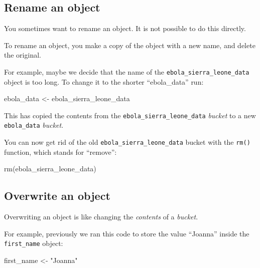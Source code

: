 \documentclass[
  letterpaper,
  DIV=11,
  numbers=noendperiod]{scrreprt}
\newenvironment{Shaded}{\begin{snugshade}}{\end{snugshade}}
\newcommand{\FunctionTok}[1]{\textcolor[rgb]{0.28,0.35,0.67}{#1}}
\newcommand{\NormalTok}[1]{\textcolor[rgb]{0.00,0.23,0.31}{#1}}
\newcommand{\OtherTok}[1]{\textcolor[rgb]{0.00,0.23,0.31}{#1}}
\newcommand{\StringTok}[1]{\textcolor[rgb]{0.13,0.47,0.30}{#1}}
\begin{document}
\subsection{Rename an object}\label{rename-an-object}

You sometimes want to rename an object. It is not possible to do this
directly.

To rename an object, you make a copy of the object with a new name, and
delete the original.

For example, maybe we decide that the name of the
\texttt{ebola\_sierra\_leone\_data} object is too long. To change it to
the shorter ``ebola\_data'' run:

\begin{Shaded}
\begin{Highlighting}[]
\NormalTok{ebola\_data }\OtherTok{\textless{}{-}}\NormalTok{ ebola\_sierra\_leone\_data}
\end{Highlighting}
\end{Shaded}

This has copied the contents from the
\texttt{ebola\_sierra\_leone\_data} \emph{bucket} to a new
\texttt{ebola\_data} \emph{bucket}.

You can now get rid of the old \texttt{ebola\_sierra\_leone\_data}
bucket with the \texttt{rm()} function, which stands for ``remove'':

\begin{Shaded}
\begin{Highlighting}[]
\FunctionTok{rm}\NormalTok{(ebola\_sierra\_leone\_data)}
\end{Highlighting}
\end{Shaded}

\subsection{Overwrite an object}\label{overwrite-an-object}

Overwriting an object is like changing the \emph{contents} of a
\emph{bucket}.

For example, previously we ran this code to store the value ``Joanna''
inside the \texttt{first\_name} object:

\begin{Shaded}
\begin{Highlighting}[]
\NormalTok{first\_name }\OtherTok{\textless{}{-}} \StringTok{"Joanna"}
\end{Highlighting}
\end{Shaded}
\end{document}
